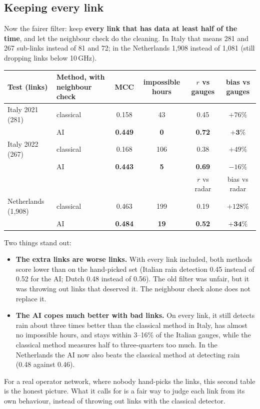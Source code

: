 \subsection{Keeping every link}
Now the fairer filter: keep \textbf{every link that has data at least half of the time}, and let the neighbour check do the
cleaning. In Italy that means 281 and 267 sub-links instead of 81 and 72; in the Netherlands 1{,}908 instead of 1{,}081
(still dropping links below 10\,GHz).
\begin{center}\footnotesize\setlength{\tabcolsep}{4pt}
\begin{tabular}{llcccc}
\toprule
Test (links) & Method, with neighbour check & MCC & impossible hours & $r$ vs gauges & bias vs gauges\\
\midrule
Italy 2021 (281) & classical & 0.158 & 43 & 0.45 & $+76\%$\\
                 & AI        & \textbf{0.449} & \textbf{0} & \textbf{0.72} & $\mathbf{+3\%}$\\
Italy 2022 (267) & classical & 0.168 & 106 & 0.38 & $+49\%$\\
                 & AI        & \textbf{0.443} & \textbf{5} & \textbf{0.69} & $-16\%$\\
\midrule
& & & & $r$ vs radar & bias vs radar\\
\midrule
Netherlands (1{,}908) & classical & 0.463 & 199 & 0.19 & $+128\%$\\
                      & AI        & \textbf{0.484} & \textbf{19} & \textbf{0.52} & $\mathbf{+34\%}$\\
\bottomrule
\end{tabular}
\end{center}

Two things stand out:
\begin{itemize}
\item \textbf{The extra links are worse links.} With every link included, both methods score lower than on the hand-picked
set (Italian rain detection 0.45 instead of 0.52 for the AI; Dutch 0.48 instead of 0.56). The old filter was unfair, but it
was throwing out links that deserved it. The neighbour check alone does not replace it.
\item \textbf{The AI copes much better with bad links.} On every link, it still detects rain about three times better than
the classical method in Italy, has almost no impossible hours, and stays within 3--16\% of the Italian gauges, while the
classical method measures half to three-quarters too much. In the Netherlands the AI now also beats the classical method at
detecting rain (0.48 against 0.46).
\end{itemize}
For a real operator network, where nobody hand-picks the links, this second table is the honest picture. What it calls for
is a fair way to judge each link from its own behaviour, instead of throwing out links with the classical detector.

